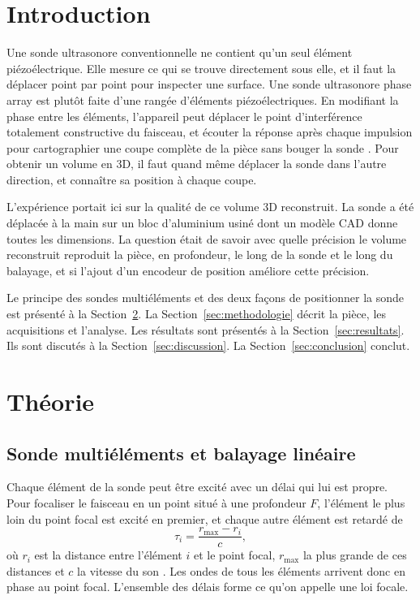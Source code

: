 \documentclass[11pt,letterpaper]{article}
\newcommand{\beq}[1]{\begin{equation} \label{#1}}
\def\enq{\end{equation}}
\begin{document}
\section{Introduction}

Une sonde ultrasonore conventionnelle ne contient qu'un seul élément piézoélectrique. Elle mesure ce qui se trouve directement sous elle, et il faut la déplacer point par point pour inspecter une surface. Une sonde ultrasonore phase array est plutôt faite d'une rangée d'éléments piézoélectriques. En modifiant la phase entre les éléments, l'appareil peut déplacer le point d'interférence totalement constructive du faisceau, et écouter la réponse après chaque impulsion pour cartographier une coupe complète de la pièce sans bouger la sonde \cite{drinkwater}. Pour obtenir un volume en 3D, il faut quand même déplacer la sonde dans l'autre direction, et connaître sa position à chaque coupe.

L'expérience portait ici sur la qualité de ce volume 3D reconstruit. La sonde a été déplacée à la main sur un bloc d'aluminium usiné dont un modèle CAD donne toutes les dimensions. La question était de savoir avec quelle précision le volume reconstruit reproduit la pièce, en profondeur, le long de la sonde et le long du balayage, et si l'ajout d'un encodeur de position améliore cette précision.

Le principe des sondes multiéléments et des deux façons de positionner la sonde est présenté à la Section~\ref{sec:theorie}. La Section~\ref{sec:methodologie} décrit la pièce, les acquisitions et l'analyse. Les résultats sont présentés à la Section~\ref{sec:resultats}. Ils sont discutés à la Section~\ref{sec:discussion}. La Section~\ref{sec:conclusion} conclut.

\section{Théorie}
\label{sec:theorie}

\subsection{Sonde multiéléments et balayage linéaire}

Chaque élément de la sonde peut être excité avec un délai qui lui est propre. Pour focaliser le faisceau en un point situé à une profondeur $F$, l'élément le plus loin du point focal est excité en premier, et chaque autre élément est retardé de
\beq{eq:loi}
    \tau_i = \frac{r_{\max} - r_i}{c} ,
\enq
où $r_i$ est la distance entre l'élément $i$ et le point focal, $r_{\max}$ la plus grande de ces distances et $c$ la vitesse du son \cite{olympus}. Les ondes de tous les éléments arrivent donc en phase au point focal. L'ensemble des délais forme ce qu'on appelle une loi focale.
\end{document}
